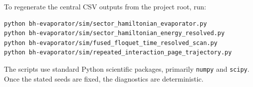 \documentclass[aps,prd,onecolumn,longbibliography,nofootinbib]{revtex4-2}
\begin{document}
To regenerate the central CSV outputs from the project root, run:
\begin{verbatim}
python bh-evaporator/sim/sector_hamiltonian_evaporator.py
python bh-evaporator/sim/sector_hamiltonian_energy_resolved.py
python bh-evaporator/sim/fused_floquet_time_resolved_scan.py
python bh-evaporator/sim/repeated_interaction_page_trajectory.py
\end{verbatim}
The scripts use standard Python scientific packages, primarily
\texttt{numpy} and \texttt{scipy}.  Once the stated seeds are fixed, the
diagnostics are deterministic.



\end{document}
